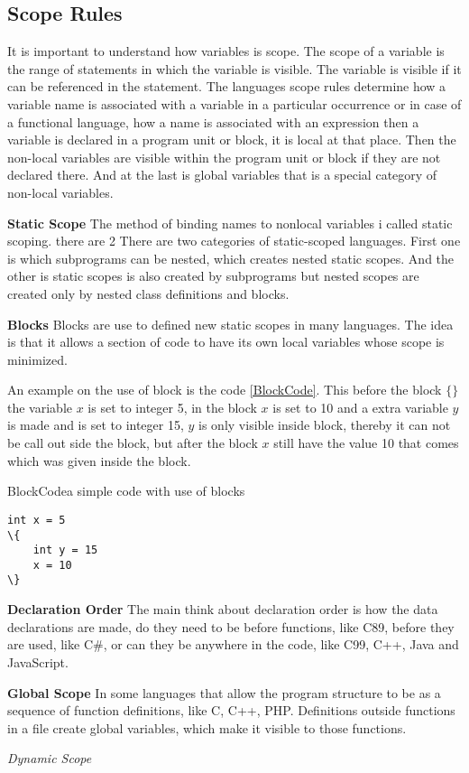 \subsection{Scope Rules}
It is important to understand how variables is scope. The scope of a variable is the range of statements in which the variable is visible. The variable is visible if it can be referenced in the statement.
The languages scope rules determine how a variable name is associated with a variable in a particular occurrence or in case of a functional language, how a name is associated with an expression
then a variable is declared in a program unit or block, it is local at that place. Then the non-local variables are visible within the program unit or block if they are not declared there. And at the last is global variables that is a special category of non-local variables.

\textbf{Static Scope}
The method of binding names to nonlocal variables i called static scoping. there are 2 There are two categories of static-scoped languages. First one is which subprograms can be nested, which creates nested static scopes. And the other is static scopes is also created by subprograms but nested scopes are created only by nested class definitions and blocks.

\textbf{Blocks}
Blocks are use to defined new static scopes in many languages. The idea is that it allows a section of code to have its own local variables whose scope is minimized. %

An example on the use of block is the code \ref{BlockCode}. This before the block $\{ \}$ the variable $x$ is set to integer 5, in the block $x$ is set to 10 and a extra variable $y$ is made and is set to integer 15, $y$ is only visible inside block, thereby it can not be call out side the block, but after the block $x$ still have the value 10 that comes which was given inside the block.

\begin{code}{BlockCode}{a simple code with use of blocks}
\begin{lstlisting}
int x = 5
\{
    int y = 15
    x = 10
\} 
\end{lstlisting}
\end{code}

\textbf{Declaration Order}
The main think about declaration order is how the data declarations are made, do they need to be before functions, like C89, before they are used, like C#, or can they be anywhere in the code, like C99, C++, Java and JavaScript.

\textbf{Global Scope}
In some languages that allow the program structure to be as a sequence of function definitions, like C, C++, PHP. Definitions outside functions in a file create global variables, which make it  visible to those functions. 


\textit{Dynamic Scope}

